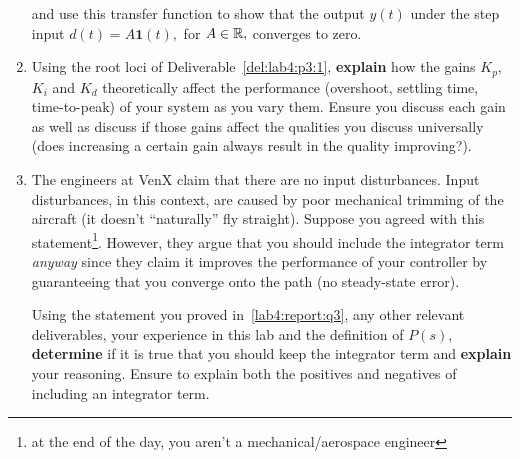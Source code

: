 \begin{deliverable}[label={lab4:report}]
\begin{enumerate}[label={(\arabic*)}]
{\begin{center}
      \end{center}
      and use this transfer function to show that the output \(y(t)\) under the step input \(d(t) = A \mathbf{1}(t),\) for \(A \in \mathbb{R},\) converges to zero.
      \label{lab4:report:q3}
    }
    \item{%
      Using the root loci of Deliverable~\ref{del:lab4:p3:1}, \textbf{explain} how the gains \(K_p,\) \(K_i\) and \(K_d\) theoretically affect the performance (overshoot, settling time, time-to-peak) of your system as you vary them.
      Ensure you discuss each gain as well as discuss if those gains affect the qualities you discuss universally (does increasing a certain gain always result in the quality improving?).
      \label{lab4:report:q4}
    }
    \item{%
      The engineers at VenX claim that there are no input disturbances.
      Input disturbances, in this context, are caused by poor mechanical trimming of the aircraft (it doesn't ``naturally'' fly straight).
      Suppose you agreed with this statement\footnote{at the end of the day, you aren't a mechanical/aerospace engineer}.
      However, they argue that you should include the integrator term \emph{anyway} since they claim it improves the performance of your controller by guaranteeing that you converge onto the path (no steady-state error).

      Using the statement you proved in~\ref{lab4:report:q3}, any other relevant deliverables, your experience in this lab and the definition of \(P(s),\) \textbf{determine} if it is true that you should keep the integrator term and \textbf{explain} your reasoning. Ensure to explain both the positives and negatives of including an integrator term.

}
\end{enumerate}
\end{deliverable}
